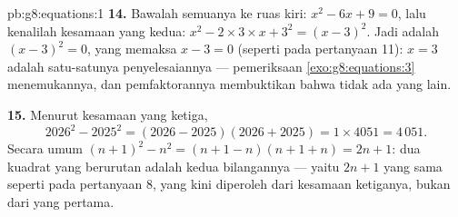 \begin{solution}{pb:g8:equations:1}
\textbf{14.} Bawalah semuanya ke ruas kiri:
$x^2 - 6x + 9 = 0$, lalu kenalilah kesamaan yang kedua:
$x^2 - 2 \times 3 \times x + 3^2 = (x - 3)^2$. Jadi 
adalah $(x - 3)^2 = 0$, yang memaksa $x - 3 = 0$ (seperti pada
pertanyaan 11): $x = 3$ adalah satu-satunya penyelesaiannya ---
pemeriksaan \cref{exo:g8:equations:3} menemukannya, dan
pemfaktorannya membuktikan bahwa tidak ada yang lain.

\textbf{15.} Menurut kesamaan yang ketiga,
\[
2026^2 - 2025^2 = (2026 - 2025)(2026 + 2025)
= 1 \times 4051 = 4\,051 .
\]
Secara umum $(n+1)^2 - n^2 = (n + 1 - n)(n + 1 + n) = 2n + 1$:
 dua kuadrat yang berurutan adalah  kedua bilangannya
--- yaitu $2n + 1$ yang sama seperti pada pertanyaan 8, yang kini
diperoleh dari kesamaan ketiganya, bukan dari yang pertama.

\end{solution}
